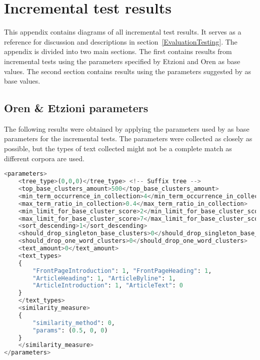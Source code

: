 
\chapter{Incremental test results} %

\label{AppendixA} %


This appendix contains diagrams of all incremental test results. It serves as a reference for discussion and descriptions in section~\ref{EvaluationTesting}. The appendix is divided into two main sections. The first contains results from incremental tests using the parameters specified by Etzioni and Oren as base values. The second section contains results using the parameters suggested by \supervisor as base values.

\section{Oren \& Etzioni parameters}

The following results were obtained by applying the parameters used by \citeauthor{Oren1998} as base parameters for the incremental tests. The parameters were collected as closely as possible, but the types of text collected might not be a complete match as different corpora are used.

\begin{lstlisting}[float=t, language=python, label=lst:etzioniparams, caption={Parameter set used in Oren and Etzioni.}]
<parameters>
    <tree_type>(0,0,0)</tree_type> <!-- Suffix tree -->
    <top_base_clusters_amount>500</top_base_clusters_amount>
    <min_term_occurrence_in_collection>4</min_term_occurrence_in_collection>
    <max_term_ratio_in_collection>0.4</max_term_ratio_in_collection>
    <min_limit_for_base_cluster_score>2</min_limit_for_base_cluster_score>
    <max_limit_for_base_cluster_score>7</max_limit_for_base_cluster_score>
    <sort_descending>1</sort_descending>
    <should_drop_singleton_base_clusters>0</should_drop_singleton_base_clusters>
    <should_drop_one_word_clusters>0</should_drop_one_word_clusters>
    <text_amount>0</text_amount>
    <text_types>
    {
    	"FrontPageIntroduction": 1, "FrontPageHeading": 1,
    	"ArticleHeading": 1, "ArticleByline": 1,
    	"ArticleIntroduction": 1, "ArticleText": 0
    }
    </text_types>
    <similarity_measure>
    {
    	"similarity_method": 0,
    	"params": (0.5, 0, 0)
    }
   	</similarity_measure>
</parameters>
\end{lstlisting}

